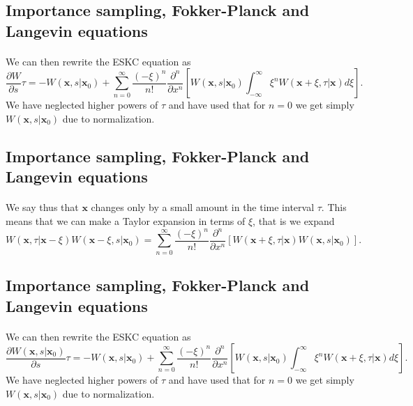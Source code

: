 \documentclass[%
twoside,                 %
final,                   %
10pt]{article}
\begin{document}
\subsection*{Importance sampling, Fokker-Planck and Langevin equations}

\paragraph{}
We can then rewrite the ESKC equation as 
\[
\frac{\partial W}{\partial s}\tau=-W(\mathbf{x},s|\mathbf{x}_0)+
\sum_{n=0}^{\infty}\frac{(-\xi)^n}{n!}\frac{\partial^n}{\partial x^n}
\left[W(\mathbf{x},s|\mathbf{x}_0)\int_{-\infty}^{\infty} \xi^nW(\mathbf{x}+\xi,\tau|\mathbf{x})d\xi\right].
\]
We have neglected higher powers of $\tau$ and have used that for $n=0$ 
we get simply $W(\mathbf{x},s|\mathbf{x}_0)$ due to normalization.




\subsection*{Importance sampling, Fokker-Planck and Langevin equations}

\paragraph{}
We say thus that $\mathbf{x}$ changes only by a small amount in the time interval $\tau$. 
This means that we can make a Taylor expansion in terms of $\xi$, that is we
expand
\[
W(\mathbf{x},\tau|\mathbf{x}-\xi)W(\mathbf{x}-\xi,s|\mathbf{x}_0) =
\sum_{n=0}^{\infty}\frac{(-\xi)^n}{n!}\frac{\partial^n}{\partial x^n}\left[W(\mathbf{x}+\xi,\tau|\mathbf{x})W(\mathbf{x},s|\mathbf{x}_0)
\right].
\]




\subsection*{Importance sampling, Fokker-Planck and Langevin equations}

\paragraph{}
We can then rewrite the ESKC equation as 
\[
\frac{\partial W(\mathbf{x},s|\mathbf{x}_0)}{\partial s}\tau=-W(\mathbf{x},s|\mathbf{x}_0)+
\sum_{n=0}^{\infty}\frac{(-\xi)^n}{n!}\frac{\partial^n}{\partial x^n}
\left[W(\mathbf{x},s|\mathbf{x}_0)\int_{-\infty}^{\infty} \xi^nW(\mathbf{x}+\xi,\tau|\mathbf{x})d\xi\right].
\]
We have neglected higher powers of $\tau$ and have used that for $n=0$ 
we get simply $W(\mathbf{x},s|\mathbf{x}_0)$ due to normalization.
\end{document}

